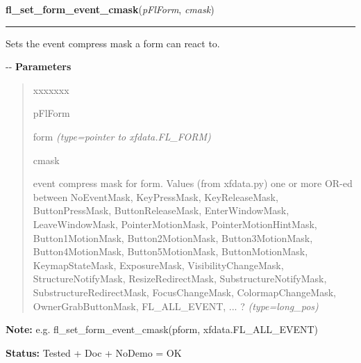 \hspace{.8\funcindent}\begin{boxedminipage}{\funcwidth}

    \raggedright \textbf{fl\_set\_form\_event\_cmask}(\textit{pFlForm}, \textit{cmask})

    \vspace{-1.5ex}

    \rule{\textwidth}{0.5\fboxrule}
\setlength{\parskip}{2ex}

Sets the event compress mask a form can react to.

-{}-
\setlength{\parskip}{1ex}
      \textbf{Parameters}
      \vspace{-1ex}

      \begin{quote}
        \begin{Ventry}{xxxxxxx}

          \item[pFlForm]


form
            {\it (type=pointer to xfdata.FL\_FORM)}

          \item[cmask]


event compress mask for form. Values (from xfdata.py) one or more
OR-ed between NoEventMask, KeyPressMask, KeyReleaseMask,
ButtonPressMask, ButtonReleaseMask, EnterWindowMask, LeaveWindowMask,
PointerMotionMask, PointerMotionHintMask, Button1MotionMask,
Button2MotionMask, Button3MotionMask, Button4MotionMask,
Button5MotionMask, ButtonMotionMask, KeymapStateMask, ExposureMask,
VisibilityChangeMask, StructureNotifyMask, ResizeRedirectMask,
SubstructureNotifyMask, SubstructureRedirectMask, FocusChangeMask,
ColormapChangeMask, OwnerGrabButtonMask, FL\_ALL\_EVENT, ... ?
            {\it (type=long\_pos)}

        \end{Ventry}

      \end{quote}

\textbf{Note:} 
e.g. fl\_set\_form\_event\_cmask(pform, xfdata.FL\_ALL\_EVENT)


\textbf{Status:} 
Tested + Doc + NoDemo = OK


    \end{boxedminipage}

    \label{xformslib:flbasic:fl_get_form_event_cmask}

